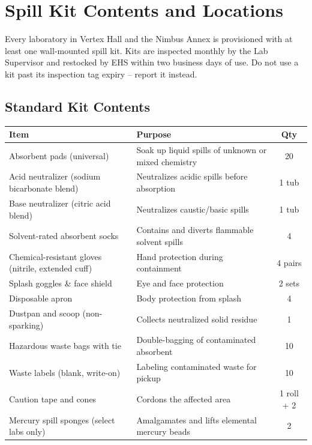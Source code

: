 
\section{Spill Kit Contents and Locations}

Every laboratory in Vertex Hall and the Nimbus Annex is provisioned with at least one wall-mounted
spill kit. Kits are inspected monthly by the Lab Supervisor and restocked by EHS within two
business days of use. Do not use a kit past its inspection tag expiry -- report it instead.

\subsection*{Standard Kit Contents}
\small
\renewcommand{\arraystretch}{1.1}
\begin{tabularx}{\linewidth}{@{}l X c@{}}
\toprule
\textbf{Item} & \textbf{Purpose} & \textbf{Qty}\\
\midrule
Absorbent pads (universal) & Soak up liquid spills of unknown or mixed chemistry & 20\\
Acid neutralizer (sodium bicarbonate blend) & Neutralizes acidic spills before absorption & 1 tub\\
Base neutralizer (citric acid blend) & Neutralizes caustic/basic spills & 1 tub\\
Solvent-rated absorbent socks & Contains and diverts flammable solvent spills & 4\\
Chemical-resistant gloves (nitrile, extended cuff) & Hand protection during containment & 4 pairs\\
Splash goggles \& face shield & Eye and face protection & 2 sets\\
Disposable apron & Body protection from splash & 4\\
Dustpan and scoop (non-sparking) & Collects neutralized solid residue & 1\\
Hazardous waste bags with tie & Double-bagging of contaminated absorbent & 10\\
Waste labels (blank, write-on) & Labeling contaminated waste for pickup & 10\\
Caution tape and cones & Cordons the affected area & 1 roll + 2\\
Mercury spill sponges (select labs only) & Amalgamates and lifts elemental mercury beads & 2\\
\bottomrule
\end{tabularx}
\normalsize

